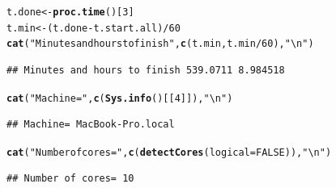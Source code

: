 \documentclass[9pt]{article}\usepackage[]{graphicx}\usepackage[]{xcolor}
\makeatletter
\newcommand{\hlnum}[1]{\textcolor[rgb]{0.686,0.059,0.569}{#1}}%
\newcommand{\hlstr}[1]{\textcolor[rgb]{0.192,0.494,0.8}{#1}}%
\newcommand{\hlopt}[1]{\textcolor[rgb]{0,0,0}{#1}}%
\newcommand{\hlstd}[1]{\textcolor[rgb]{0.345,0.345,0.345}{#1}}%
\newcommand{\hlkwb}[1]{\textcolor[rgb]{0.69,0.353,0.396}{#1}}%
\newcommand{\hlkwc}[1]{\textcolor[rgb]{0.333,0.667,0.333}{#1}}%
\newcommand{\hlkwd}[1]{\textcolor[rgb]{0.737,0.353,0.396}{\textbf{#1}}}%
\newenvironment{kframe}{%
 \def\at@end@of@kframe{}%
 \ifinner\ifhmode%
  \def\at@end@of@kframe{\end{minipage}}%
  \begin{minipage}{\columnwidth}%
 \fi\fi%
 \def\FrameCommand##1{\hskip\@totalleftmargin \hskip-\fboxsep
 \colorbox{shadecolor}{##1}\hskip-\fboxsep
     \hskip-\linewidth \hskip-\@totalleftmargin \hskip\columnwidth}%
 \MakeFramed {\advance\hsize-\width
   \@totalleftmargin\z@ \linewidth\hsize
   \@setminipage}}%
 {\par\unskip\endMakeFramed%
 \at@end@of@kframe}
\newenvironment{knitrout}{}{} %
\theoremstyle{definition}
\theoremstyle{remark}
\makeatother
\begin{document}
\begin{knitrout}
\color{fgcolor}\begin{kframe}
\begin{alltt}
\hlstd{t.done} \hlkwb{<-} \hlkwd{proc.time}\hlstd{()[}\hlnum{3}\hlstd{]}
\hlstd{t.min} \hlkwb{<-} \hlstd{(t.done} \hlopt{-} \hlstd{t.start.all)}\hlopt{/}\hlnum{60}
\hlkwd{cat}\hlstd{(}\hlstr{"Minutes and hours to finish"}\hlstd{,} \hlkwd{c}\hlstd{(t.min, t.min}\hlopt{/}\hlnum{60}\hlstd{),} \hlstr{"\textbackslash{}n"}\hlstd{)}
\end{alltt}
\begin{verbatim}
## Minutes and hours to finish 539.0711 8.984518
\end{verbatim}
\begin{alltt}
\hlkwd{cat}\hlstd{(}\hlstr{"Machine="}\hlstd{,} \hlkwd{c}\hlstd{(}\hlkwd{Sys.info}\hlstd{()[[}\hlnum{4}\hlstd{]]),} \hlstr{"\textbackslash{}n"}\hlstd{)}
\end{alltt}
\begin{verbatim}
## Machine= MacBook-Pro.local
\end{verbatim}
\begin{alltt}
\hlkwd{cat}\hlstd{(}\hlstr{"Number of cores="}\hlstd{,} \hlkwd{c}\hlstd{(}\hlkwd{detectCores}\hlstd{(}\hlkwc{logical} \hlstd{=} \hlnum{FALSE}\hlstd{)),} \hlstr{"\textbackslash{}n"}\hlstd{)}
\end{alltt}
\begin{verbatim}
## Number of cores= 10
\end{verbatim}
\end{kframe}
\end{knitrout}
\end{document}
